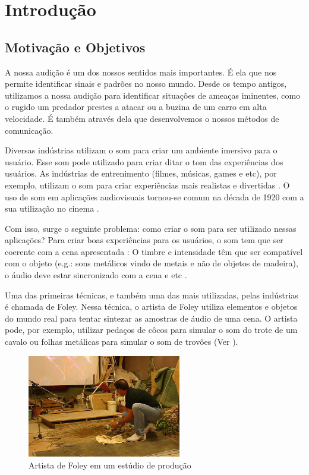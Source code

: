 \chapter{Introdução}

\section{Motivação e Objetivos}

A nossa audição é um dos nossos sentidos mais importantes. É ela que nos permite identificar sinais e padrões no nosso mundo. Desde os tempo antigos, utilizamos a nossa audição para identificar situações de ameaças iminentes, como o rugido um predador prestes a atacar ou a buzina de um carro em alta velocidade. É também através dela que desenvolvemos o nossos métodos de comunicação.

Diversas indústrias utilizam o som para criar um ambiente imersivo para o usuário. Esse som pode utilizado para criar ditar o tom das experiências dos usuários. As indústrias de entrenimento (filmes, músicas, games e etc), por exemplo, utilizam o som para criar experiências mais realistas e divertidas \cite{bridgett2007}. O uso de som em aplicações audiovisuais tornou-se comum na década de 1920 com a sua utilização no cinema \cite{haussen2008som}.

Com isso, surge o seguinte problema: como criar o som para ser utilizado nessas aplicações? Para criar boas experiências para os usuários, o som tem que ser coerente com a cena apresentada \cite{rocchesso2003sounding}: O timbre e intensidade têm que ser compatível com o objeto (e.g.: sons metálicos vindo de metais e não de objetos de madeira), o áudio deve estar sincronizado com a cena e etc .

Uma das primeiras técnicas, e também uma das mais utilizadas, pelas indústrias é chamada de Foley. Nessa técnica, o artista de Foley utiliza elementos e objetos do mundo real para tentar sintezar as amostras de áudio de uma cena. O artista pode, por exemplo, utilizar pedaços de côcos para simular o som do trote de um cavalo \cite{bonebright2012were} ou folhas metálicas para simular o som de trovões (Ver ).

\begin{figure}[ht]
	\centering
	\includegraphics[width=0.6\textwidth]{introduction/foley.jpg}
	\caption[Artista de Foley em um estúdio de produção]{Artista de Foley em um estúdio de produção\footnotemark}\label{fig:foley}
\end{figure}


